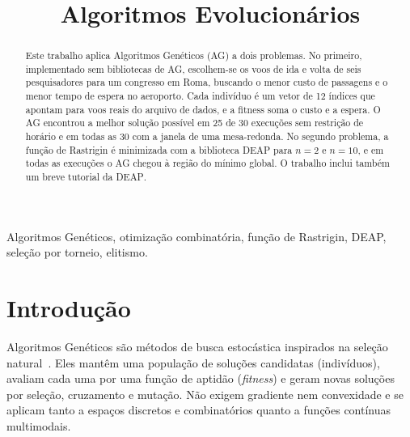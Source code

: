 \documentclass[conference]{IEEEtran}
\newcommand{\deap}{\textsc{DEAP}}
\begin{document}
\title{Algoritmos Evolucionários}

\author{
}

\maketitle

\begin{abstract}
Este trabalho aplica Algoritmos Genéticos (AG) a dois problemas. No primeiro, implementado sem bibliotecas de AG, escolhem-se os voos de ida e volta de seis pesquisadores para um congresso em Roma, buscando o menor custo de passagens e o menor tempo de espera no aeroporto. Cada indivíduo é um vetor de 12 índices que apontam para voos reais do arquivo de dados, e a fitness soma o custo e a espera. O AG encontrou a melhor solução possível em 25 de 30 execuções sem restrição de horário e em todas as 30 com a janela de uma mesa-redonda. No segundo problema, a função de Rastrigin é minimizada com a biblioteca \deap{} para $n=2$ e $n=10$, e em todas as execuções o AG chegou à região do mínimo global. O trabalho inclui também um breve tutorial da \deap{}.
\end{abstract}

\renewcommand\IEEEkeywordsname{Palavras-chave}
\begin{IEEEkeywords}
Algoritmos Genéticos, otimização combinatória, função de Rastrigin, DEAP, seleção por torneio, elitismo.
\end{IEEEkeywords}

\section{Introdução}
Algoritmos Genéticos são métodos de busca estocástica inspirados na seleção natural~\cite{goldberg1989}. Eles mantêm uma população de soluções candidatas (indivíduos), avaliam cada uma por uma função de aptidão (\emph{fitness}) e geram novas soluções por seleção, cruzamento e mutação. Não exigem gradiente nem convexidade e se aplicam tanto a espaços discretos e combinatórios quanto a funções contínuas multimodais.
\end{document}
